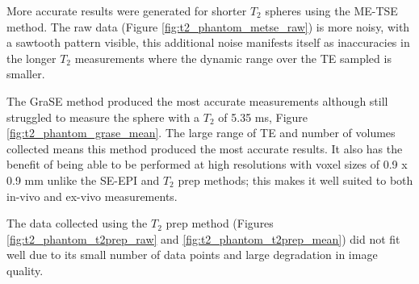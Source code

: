 More accurate results were generated for shorter $T_2$ spheres using the \ac{ME-TSE} method. The raw data (Figure \ref{fig:t2_phantom_metse_raw}) is more noisy, with a sawtooth pattern visible, this additional noise manifests itself as inaccuracies in the longer $T_2$ measurements where the dynamic range over the \ac{TE} sampled is smaller.

The \ac{GraSE} method produced the most accurate measurements although still struggled to measure the sphere with a $T_2$ of 5.35 ms, Figure \ref{fig:t2_phantom_grase_mean}. The large range of \ac{TE} and number of volumes collected means this method produced the most accurate results. It also has the benefit of being able to be performed at high resolutions with voxel sizes of 0.9 x 0.9 mm unlike the \ac{SE}-\ac{EPI} and $T_2$ prep methods; this makes it well suited to both in-vivo and ex-vivo measurements.

The data collected using the $T_2$ prep method (Figures \ref{fig:t2_phantom_t2prep_raw} and \ref{fig:t2_phantom_t2prep_mean}) did not fit well due to its small number of data points and large degradation in image quality.

